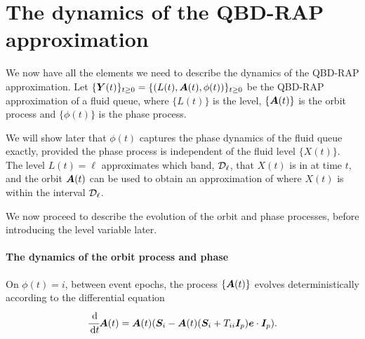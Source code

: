 \section{The dynamics of the QBD-RAP approximation}\label{sec: dynamics}
We now have all the elements we need to describe the dynamics of the QBD-RAP approximation. Let \(\{\boldsymbol Y(t)\}_{t\geq0} = \{(L(t),\boldsymbol A(t),\phi(t))\}_{t\geq0}\) be the QBD-RAP approximation of a fluid queue, where \(\{L(t)\}\) is the level, \(\{\boldsymbol A(t)\}\) is the orbit process and \(\{\phi(t)\}\) is the phase process.  

We will show later that \(\phi(t)\) captures the phase dynamics of the fluid queue exactly, provided the phase process is independent of the fluid level \(\{X(t)\}\). The level \(L(t)=\ell\) approximates which band, \(\mathcal{D}_\ell\), that \(X(t)\) is in at time \(t\), and the orbit \(\boldsymbol A(t)\) can be used to obtain an approximation of where \(X(t)\) is within the interval \(\mathcal{D}_\ell\). 

We now proceed to describe the evolution of the orbit and phase processes, before introducing the level variable later. 

\paragraph{The dynamics of the orbit process and phase} On \({\phi}(t)=i\), between event epochs, the process \(\{\boldsymbol A(t)\}\) evolves deterministically according to the differential equation 
\begin{align}\label{eqn: At DE}
\cfrac{\, \mathrm{d}}{\, \mathrm{d} t}\boldsymbol A(t) = \boldsymbol A(t)(\boldsymbol{S}_i - \boldsymbol A(t) (\boldsymbol{S}_i + T_{ii}\boldsymbol{I}_p)\boldsymbol e\cdot\boldsymbol{I}_p).
\end{align}

